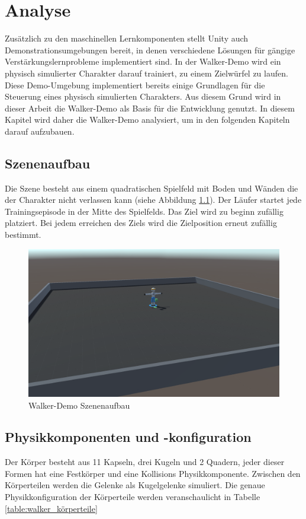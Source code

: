 {\chapter{Analyse}}
\label{sec:analyse}
Zusätzlich zu den maschinellen Lernkomponenten stellt Unity auch Demonstrationsumgebungen bereit, in denen verschiedene Lösungen für gängige Verstärkungslernprobleme implementiert sind. In der Walker-Demo wird ein physisch simulierter Charakter darauf trainiert, zu einem Zielwürfel zu laufen. Diese Demo-Umgebung implementiert bereits einige Grundlagen für die Steuerung eines physisch simulierten Charakters. Aus diesem Grund wird in dieser Arbeit die Walker-Demo als Basis für die Entwicklung genutzt. In diesem Kapitel wird daher die Walker-Demo analysiert, um in den folgenden Kapiteln darauf aufzubauen.

\section{Szenenaufbau}
Die Szene besteht aus einem quadratischen Spielfeld mit Boden und Wänden die der Charakter nicht verlassen kann (siehe Abbildung \ref{fig:walker_aufbau}). Der Läufer startet jede Trainingsepisode in der Mitte des Spielfelds. Das Ziel wird zu beginn zufällig platziert. Bei jedem erreichen des Ziels wird die Zielposition erneut zufällig bestimmt.

\begin{figure}[H]
  \centering  
  \includegraphics[scale=0.35]{img/walker_aufbau.png}
  \caption{Walker-Demo Szenenaufbau}
  \label{fig:walker_aufbau}
\end{figure}

\section{Physikkomponenten und -konfiguration}
Der Körper besteht aus 11 Kapseln, drei Kugeln und 2 Quadern, jeder dieser Formen hat eine Festkörper und eine Kollisions Physikkomponente. Zwischen den Körperteilen werden die Gelenke als Kugelgelenke simuliert. Die genaue Physikkonfiguration der Körperteile werden veranschaulicht in Tabelle \ref{table:walker_körperteile}

